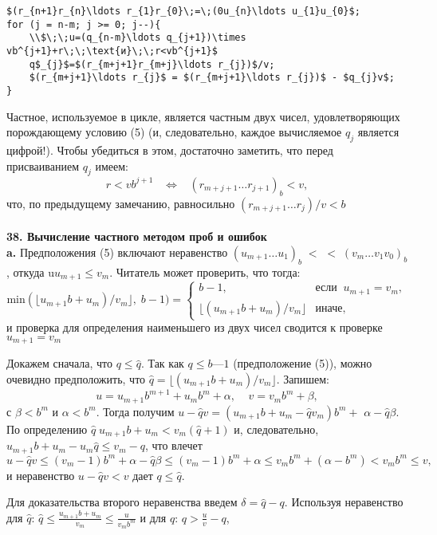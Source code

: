 \documentclass{mai_book}
\begin{document}
\begin{leftbar}
\begin{lstlisting}[frame=none, mathescape=true]
$(r_{n+1}r_{n}\ldots r_{1}r_{0}\;=\;(0u_{n}\ldots u_{1}u_{0}$;
for (j = n-m; j >= 0; j--){
	\\$\;\;u=(q_{n-m}\ldots q_{j+1})\times vb^{j+1}+r\;\;\text{и}\;\;r<vb^{j+1}$
	q$_{j}$=$(r_{m+j+1}r_{m+j}\ldots r_{j})$/v;
	$(r_{m+j+1}\ldots r_{j}$ = $(r_{m+j+1}\ldots r_{j})$ - $q_{j}v$;
}	
\end{lstlisting}
\end{leftbar}
Частное, используемое в цикле, является частным двух чисел, удо­влетворяющих порождающему условию (5) (и, следовательно, каждое
вычисляемое $q_{j}$ является цифрой!). Чтобы убедиться в этом, достаточно заметить, что перед присваиванием $q_{j}$ имеем:
$$ r<vb^{j+1}\;\;\;\Longleftrightarrow\;\;\;(r_{m+j+1}\ldots r_{j+1})_{b}<v,$$
что, по предыдущему замечанию, равносильно $(r_{m+j+1}\ldots r_{j})/v<b$
\\\\
\noindent\textbf{38. Вычисление частного методом проб и ошибок}
\\

\textbf{a.} Предположения (5) включают неравенство $(u_{m+1}\ldots u_{1})_{b}\;<$\linebreak
$<\;(v_{m}\ldots v_{1}v_{0})_{b}$, откуда u$u_{m+1}\leqslant v_{m}$. Читатель может проверить, что
тогда:
$$\text{min}(\lfloor u_{m+1}b+u_{m})/v_{m}\rfloor,\;b-1)=\left\lbrace\begin{array}{ll}
b-1,&\text{если}\;\;u_{m+1}=v_{m},\\
\lfloor(u_{m+1}b+u_{m})/v_{m}\rfloor&\text{иначе,}
\end{array}\right.$$
и проверка для определения наименьшего из двух чисел сводится к про­верке $u_{m+1}=v_{m}$

Докажем сначала, что $q\leqslant\widehat{q}$. Так как $q\leqslant b — 1$ (предположение (5)),
можно очевидно предположить, что $\widehat{q}=\lfloor(u_{m+1}b+u_{m})/v_{m}\rfloor$. Запишем:
$$u=u_{m+1}b^{m+1}+u_{m}b^m+\alpha,\;\;\;\;v=v_{m}b^m+\beta,$$
с $\beta<b^m$ и $\alpha<b^m$. Тогда получим $u-\widehat{q}v=(u_{m+1}b+u_{m}-\widehat{q}v_{m})b^m+$\linebreak
$\alpha-\widehat{q}\beta$. По определению $\widehat{q}\;u_{m+1}b+u_{m}<v_{m}(\widehat{q}+1)$ и, следовательно, $u_{m+1}b+u_{m}-u_{m}\widehat{q}\leqslant v_{m}-q$, что влечет
$$u-\widehat{q}v\leqslant(v_{m}-1)b^m+\alpha-\widehat{q}\beta\leqslant(v_{m}-1)b^m+\alpha\leqslant v_{m}b^m+(\alpha-b^m)<v_{m}b^m\leqslant v,$$
и неравенство $u-\widehat{q}v<v$ дает $q\leqslant\widehat{q}$.

Для доказательства второго неравенства введем $\delta=\widehat{q}-q$. Используя неравенство для $\widehat{q}$: $\widehat{q}\leqslant\frac{u_{m+1}b+u_{m}}{v_{m}
}\leqslant\frac{u}{v_{m}b^m}$ и для $q$: $q>\frac{u}{v}-q$,
\end{document}
